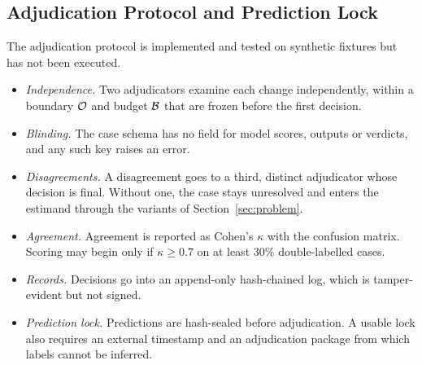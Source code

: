 \subsection{Adjudication Protocol and Prediction Lock}
The adjudication protocol is implemented and tested on synthetic fixtures but has not been executed.
\begin{itemize}
\item \emph{Independence.} Two adjudicators examine each change independently, within a boundary $\mathcal{O}$ and budget $\mathcal{B}$ that are frozen before the first decision.
\item \emph{Blinding.} The case schema has no field for model scores, \ers{} outputs or verdicts, and any such key raises an error.
\item \emph{Disagreements.} A disagreement goes to a third, distinct adjudicator whose decision is final. Without one, the case stays unresolved and enters the estimand through the variants of Section~\ref{sec:problem}.
\item \emph{Agreement.} Agreement is reported as Cohen's $\kappa$ with the confusion matrix. Scoring may begin only if $\kappa\ge0.7$ on at least 30\% double-labelled cases.
\item \emph{Records.} Decisions go into an append-only hash-chained log, which is tamper-evident but not signed.
\item \emph{Prediction lock.} Predictions are hash-sealed before adjudication. A usable lock also requires an external timestamp and an adjudication package from which labels cannot be inferred.
\end{itemize}

